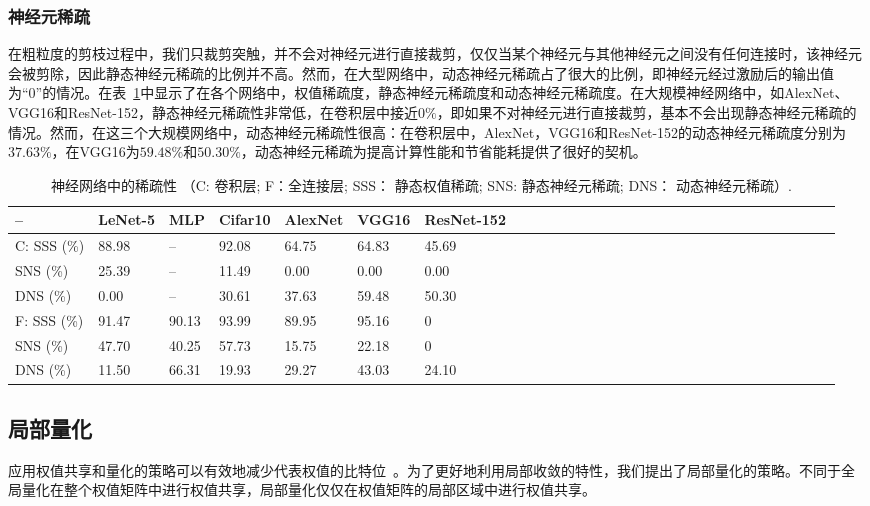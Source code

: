 \subsubsection{神经元稀疏}
在粗粒度的剪枝过程中，我们只裁剪突触，并不会对神经元进行直接裁剪，仅仅当某个神经元与其他神经元之间没有任何连接时，该神经元会被剪除，因此静态神经元稀疏的比例并不高。然而，在大型网络中，动态神经元稀疏占了很大的比例，即神经元经过激励后的输出值为“0”的情况。在表~\ref{tab:sparsities}中显示了在各个网络中，权值稀疏度，静态神经元稀疏度和动态神经元稀疏度。在大规模神经网络中，如AlexNet、VGG16和ResNet-152，静态神经元稀疏性非常低，在卷积层中接近$0\%$，即如果不对神经元进行直接裁剪，基本不会出现静态神经元稀疏的情况。然而，在这三个大规模网络中，动态神经元稀疏性很高：在卷积层中，AlexNet，VGG16和ResNet-152的动态神经元稀疏度分别为$37.63\%$，在VGG16为$59.48\%$和$50.30\%$，动态神经元稀疏为提高计算性能和节省能耗提供了很好的契机。

\begin{table}[h]
\centering
\caption{\footnotesize 神经网络中的稀疏性 （C: 卷积层; F：全连接层; SSS： 静态权值稀疏; SNS: 静态神经元稀疏; DNS： 动态神经元稀疏）.}
\label{tab:sparsities}
\begin{tabular}{@{~}lll@{~}lll@{~}lll@{~}lll@{~}lll@{~}lll@{~}llllllllllll}
\toprule
-- & LeNet-5 & MLP & Cifar10 & AlexNet & VGG16 & ResNet-152 \\
\midrule
C: SSS (\%)& 88.98 	& -- 	& 92.08 & 64.75 & 64.83 & 45.69 \\
   SNS (\%)& 25.39	& -- 	& 11.49 & 0.00 	& 0.00 	& 0.00 \\
   DNS (\%)& 0.00	& -- 	& 30.61 & 37.63	& 59.48 & 50.30 \\
\hline
F: SSS (\%)& 91.47	& 90.13	& 93.99 & 89.95	& 95.16 & 0 \\
   SNS (\%)& 47.70	& 40.25 & 57.73 & 15.75 & 22.18	& 0 \\
   DNS (\%)& 11.50	& 66.31 & 19.93	& 29.27 & 43.03	& 24.10 \\
\bottomrule
\end{tabular}
\end{table}

\subsection{局部量化}

应用权值共享和量化的策略可以有效地减少代表权值的比特位~\cite{han2015deep}。为了更好地利用局部收敛的特性，我们提出了局部量化的策略。不同于全局量化在整个权值矩阵中进行权值共享，局部量化仅仅在权值矩阵的局部区域中进行权值共享。

